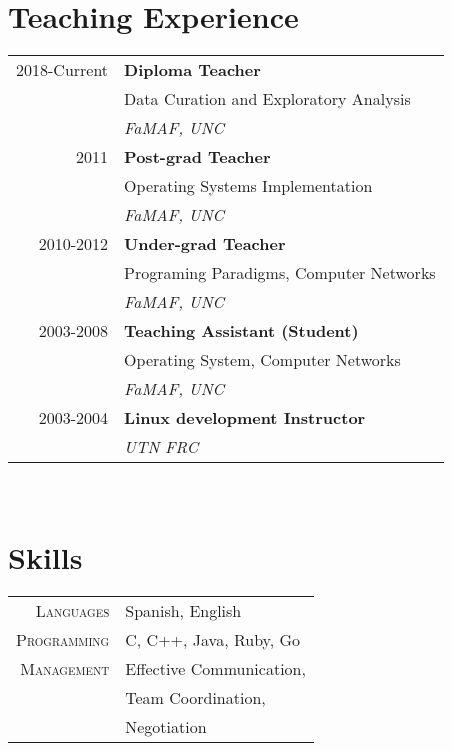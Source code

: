 \documentclass[10pt]{article}
\begin{document}
\begin{minipage}[t]{0.44\textwidth}

\section{Teaching Experience} 

\begin{tabular}{rl}
2018-Current	& \textbf{Diploma Teacher}\\
& \small Data Curation and Exploratory Analysis \\
& \textit{FaMAF, UNC}\\

2011	 & \textbf{Post-grad Teacher}\\
& \small Operating Systems Implementation \\
& \textit{FaMAF, UNC}\\

2010-2012	 & \textbf{Under-grad Teacher}\\
& \small Programing Paradigms, Computer Networks \\
& \textit{FaMAF, UNC}\\

2003-2008	 & \textbf{Teaching Assistant (Student)}\\
& \small Operating System, Computer Networks \\
& \textit{FaMAF, UNC}\\

2003-2004	 & \textbf{Linux development Instructor}\\
& \textit{UTN FRC}
\end{tabular}\\[10pt]



\section{Skills} 

\begin{tabular}{rl}
\textsc{Languages}
& Spanish, English\\
%
\textsc{Programming}
& C, C++, Java, Ruby, Go\\
%
\textsc{Management}
& Effective Communication, \\
& Team Coordination,\\
& Negotiation\\
\end{tabular}\\[10pt]



\end{minipage}
\end{document}

